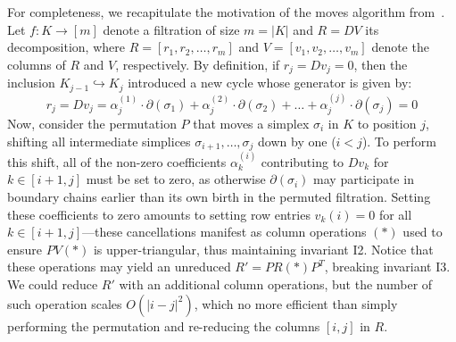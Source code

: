 \documentclass[sn-mathphys]{sn-jnl}
\begin{document}
For completeness, we recapitulate the motivation of the moves algorithm from~\cite{busaryev2010tracking}. 
Let $f: K \rightarrow [m]$ denote a filtration of size $m = \lvert K \rvert$ and $R = DV$ its decomposition, where $R = [r_1, r_2, \dots, r_m]$ and $V = [v_1, v_2, \dots, v_m]$ denote the columns of $R$ and $V$, respectively. By definition, if $r_j = D v_j = 0$, then the inclusion $K_{j-1} \hookrightarrow K_{j}$ introduced a new cycle whose generator is given by:
\begin{equation}\label{eq:coefficients}
	r_j = D v_j = \alpha_j^{(1)} \cdot \partial(\sigma_{1}) + \alpha_{j}^{(2)} \cdot \partial(\sigma_{2}) + \dots + \alpha_{j}^{(j)} \cdot \partial(\sigma_{j}) = 0
\end{equation}
Now, consider the permutation $P$ that moves a simplex $\sigma_i$ in $K$ to position $j$, shifting all intermediate simplices $\sigma_{i+1}, \dots, \sigma_{j}$ down by one ($i < j$). 
To perform this shift, all of the non-zero coefficients $\alpha_k^{(i)}$ contributing to $Dv_k$ for $k \in [i+1, j]$ must be set to zero, as otherwise $\partial(\sigma_i)$ may participate in boundary chains earlier than its own birth in the permuted filtration. 
Setting these coefficients to zero amounts to setting row entries $v_k(i) = 0$ for all $k \in [i+1,j]$---these cancellations manifest as column operations $(\ast)$ used to ensure $P V(\ast)$ is upper-triangular, thus maintaining invariant I2.
Notice that these operations may yield an unreduced $R' = P R(\ast) P^T$, breaking invariant I3.
We could reduce $R'$ with an additional column operations, but the number of such operation scales $O(\lvert i - j\rvert^2)$, which no more efficient than simply performing the permutation and re-reducing the columns $[i,j]$ in $R$. 
\end{document}
